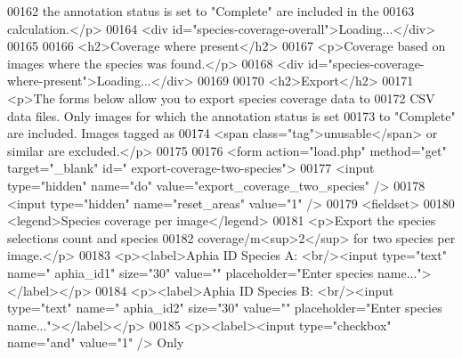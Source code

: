 \begin{DoxyCode}
00162             the annotation status is \textcolor{keyword}{set} to \textcolor{stringliteral}{"Complete"} are included in the
00163             calculation.</p>
00164             <div \textcolor{keywordtype}{id}=\textcolor{stringliteral}{"species-coverage-overall"}>Loading...</div>
00165 
00166             <h2>Coverage where present</h2>
00167             <p>Coverage based on images where the species was found.</p>
00168             <div \textcolor{keywordtype}{id}=\textcolor{stringliteral}{"species-coverage-where-present"}>Loading...</div>
00169 
00170             <h2>Export</h2>
00171             <p>The forms below allow you to export species coverage data to
00172             CSV data files. Only images \textcolor{keywordflow}{for} which the annotation status is \textcolor{keyword}{set}
00173             to \textcolor{stringliteral}{"Complete"} are included. Images tagged as
00174             <span \textcolor{keyword}{class}=\textcolor{stringliteral}{"tag"}>unusable</span> or similar are excluded.</p>
00175 
00176             <form action=\textcolor{stringliteral}{"load.php"} method=\textcolor{stringliteral}{"get"} target=\textcolor{stringliteral}{"\_blank"} \textcolor{keywordtype}{id}=\textcolor{stringliteral}{"
      export-coverage-two-species"}>
00177             <input type=\textcolor{stringliteral}{"hidden"} name=\textcolor{stringliteral}{"do"} value=\textcolor{stringliteral}{"export\_coverage\_two\_species"} 
      />
00178             <input type=\textcolor{stringliteral}{"hidden"} name=\textcolor{stringliteral}{"reset\_areas"} value=\textcolor{stringliteral}{"1"} />
00179             <fieldset>
00180                 <legend>Species coverage per image</legend>
00181                 <p>Export the species selections count and species
00182                 coverage/m<sup>2</sup> \textcolor{keywordflow}{for} two species per image.</p>
00183                 <p><label>Aphia ID Species A: <br/><input type=\textcolor{stringliteral}{"text"} name=\textcolor{stringliteral}{"
      aphia\_id1"} size=\textcolor{stringliteral}{"30"} value=\textcolor{stringliteral}{""} placeholder=\textcolor{stringliteral}{"Enter species name..."}></label></p>
00184                 <p><label>Aphia ID Species B: <br/><input type=\textcolor{stringliteral}{"text"} name=\textcolor{stringliteral}{"
      aphia\_id2"} size=\textcolor{stringliteral}{"30"} value=\textcolor{stringliteral}{""} placeholder=\textcolor{stringliteral}{"Enter species name..."}></label></p>
00185                 <p><label><input type=\textcolor{stringliteral}{"checkbox"} name=\textcolor{stringliteral}{"and"} value=\textcolor{stringliteral}{"1"} /> Only 

\end{DoxyCode}
